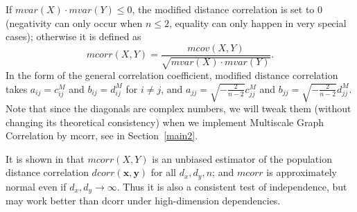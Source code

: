\documentclass[11pt]{article}
\providecommand{\mb}[1]{\boldsymbol{#1}}
\begin{document}
If $mvar(X) \cdot mvar(Y) \leq 0$, the modified distance correlation is set to $0$ (negativity can only occur when $n\leq 2$, equality can only happen in very special cases); otherwise it is defined as
\begin{equation}
\label{mcorrEqu}
mcorr(X,Y)=\frac{mcov(X,Y)}{\sqrt{mvar(X) \cdot mvar(Y)}}.
\end{equation}
In the form of the general correlation coefficient, modified distance correlation takes $a_{ij}=c^{M}_{ij}$ and $b_{ij}=d^{M}_{ij}$ for $i \neq j$, and $a_{jj}=\sqrt{-\frac{2}{n-2}}c^{M}_{jj}$ and $b_{jj}=\sqrt{-\frac{2}{n-2}}d^{M}_{jj}$. Note that since the diagonals are complex numbers, we will tweak them (without changing its theoretical consistency) when we implement Multiscale Graph Correlation by mcorr, see in Section~\ref{main2}.

It is shown in \cite{SzekelyRizzo2013a} that $mcorr(X,Y)$ is an unbiased estimator of the population distance correlation $dcorr(\mb{x},\mb{y})$ for all $d_{x}, d_{y}, n$; and $mcorr$ is approximately normal even if $d_{x},d_{y} \rightarrow \infty$. Thus it is also a consistent test of independence, but may work better than dcorr under high-dimension dependencies. 

\end{document}
